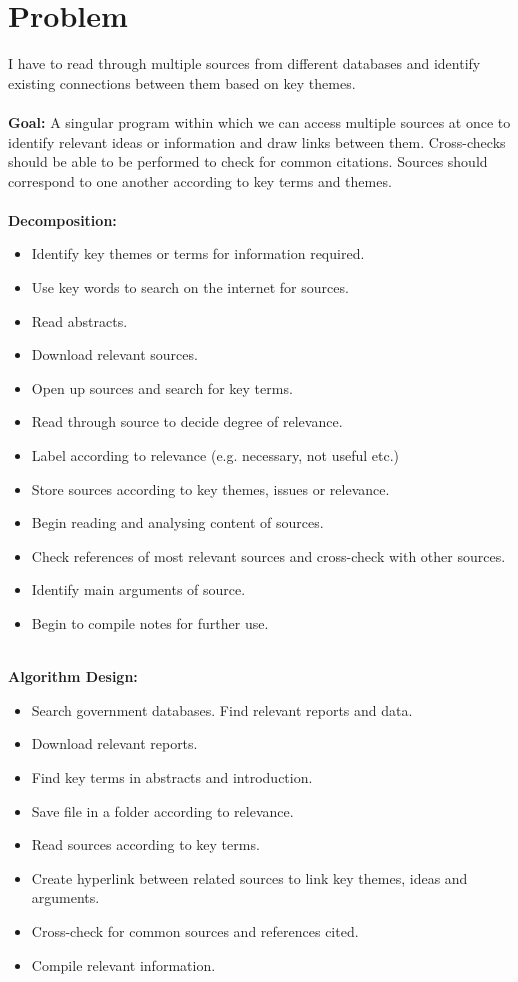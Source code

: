 \documentclass{article}
\begin{document}
\section{Problem}
I have to read through multiple sources from different databases and identify existing connections between them based on key themes.\\ 
 \\
\textbf{Goal:} A singular program within which we can access multiple sources at once to identify relevant ideas or information and draw links between them. Cross-checks should be able to be performed to check for common citations. Sources should correspond to one another according to key terms and themes.\\ 
\\
\textbf{Decomposition:}
\begin{itemize}
    \item Identify key themes or terms for information required.
    \item Use key words to search on the internet for sources. 
    \item Read abstracts. 
    \item Download relevant sources. 
    \item Open up sources and search for key terms.
    \item Read through source to decide degree of relevance.
    \item Label according to relevance (e.g. necessary, not useful etc.)
    \item Store sources according to key themes, issues or relevance.
    \item Begin reading and analysing content of sources.
    \item Check references of most relevant sources and cross-check with other sources. 
    \item Identify main arguments of source.
    \item Begin to compile notes for further use. \end{itemize} 
\\
\textbf{Algorithm Design:}
\begin{itemize}
    \item Search government databases. Find relevant reports and data.
    \item Download relevant reports.
    \item Find key terms in abstracts and introduction.
    \item Save file in a folder according to relevance.
    \item Read sources according to key terms.
    \item Create hyperlink between related sources to link key themes, ideas and arguments. 
    \item Cross-check for common sources and references cited. 
    \item Compile relevant information. \end{itemize}
\end{document}
